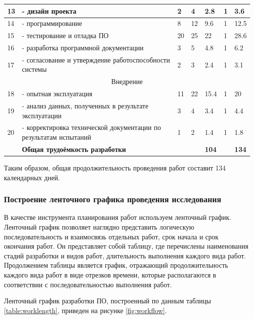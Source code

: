 \begin{longtable}{| p{2em}|>{\raggedright\arraybackslash}p{12em}|p{2em}|p{2em}|p{2em}|p{2em}|p{5em}|}
	13 & - дизайн проекта & 2 & 4 & 2.8 & 1 & 3.6\\ \hline
	14 & - программирование & 8 & 12 & 9.6 & 1 & 12.5\\ \hline
	15 & - тестирование и отладка ПО & 20 & 25 & 22 & 1 & 28.6\\ \hline
	16 & - разработка программной документации & 3 & 5 & 4.8 & 1 & 6.2\\ \hline
	17 & - согласование и утверждение работоспособности системы & 2 & 3 & 2.4 & 1 & 3.1\\ \hline
	\multicolumn{7}{|c|}{Внедрение}\\ \hline
	18 & - опытная эксплуатация & 11 & 22 & 15.4 & 1 & 20\\ \hline
	19 & - анализ данных, полученных в результате эксплуатации & 3 & 4 & 3.4 & 1 & 4.4\\ \hline
	20 & - корректировка технической документации по результатам испытаний & 1 & 2 & 1.4 & 1 & 1.8\\ \hline
	& \textbf{Общая трудоёмкость разработки} & & & \textbf{104} & & \textbf{134}\\ \hline
\end{longtable}
Таким образом, общая продолжительность проведения работ составит 134 календарных дней.

\subsubsection {Построение ленточного графика проведения исследования}
В качестве инструмента планирования работ используем ленточный график. Ленточный график позволяет наглядно представить логическую последовательность и взаимосвязь отдельных работ, срок начала и срок окончания работ. Он представляет собой таблицу, где перечислены наименования стадий разработки и видов работ, длительность выполнения каждого вида работ. Продолжением таблицы является график, отражающий продолжительность каждого вида работ в виде отрезков времени, которые располагаются в соответствии с последовательностью выполнения работ. 

Ленточный график разработки ПО, построенный по данным таблицы \ref {table:worklength}, приведен на рисунке \ref {fig:workflow}.

